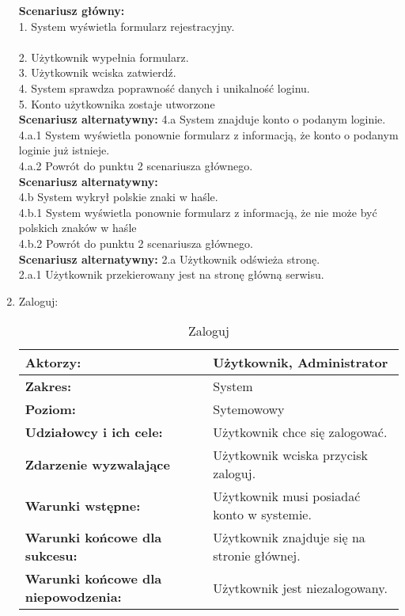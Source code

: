 \begin{enumerate}[label=(\Roman*)]
\textbf{Scenariusz główny:}\\
1. System wyświetla formularz rejestracyjny.\\\\
2. Użytkownik wypełnia formularz.\\
3. Użytkownik wciska zatwierdź.\\
4. System sprawdza poprawność danych i unikalność loginu.\\
5. Konto użytkownika zostaje utworzone\\
\textbf{Scenariusz alternatywny:}
4.a System znajduje konto o podanym loginie.\\
4.a.1 System wyświetla ponownie formularz z informacją, że konto o podanym loginie już
istnieje.\\
4.a.2 Powrót do punktu 2 scenariusza głównego.\\
\textbf{Scenariusz alternatywny:}\\
4.b System wykrył polskie znaki w haśle.\\
4.b.1 System wyświetla ponownie formularz z informacją, że nie może być polskich znaków
w haśle\\
4.b.2 Powrót do punktu 2 scenariusza głównego.\\
\textbf{Scenariusz alternatywny:}
2.a Użytkownik odświeża stronę.\\
2.a.1 Użytkownik przekierowany jest na stronę główną serwisu.\\

\item Zaloguj:
	\begin{table}[h]
\centering
\caption{Zaloguj}
\label{Zaloguj}
\begin{tabular}{|p{7cm}|p{7cm}|}
  \hline 
  \textbf{Aktorzy:} & Użytkownik, Administrator\\
  \hline
  \textbf{Zakres:} & System \\
	\hline
  \textbf{Poziom:} & Sytemowowy \\
	\hline
  \textbf{Udziałowcy i ich cele: } & Użytkownik chce się zalogować.
 \\
	\hline
  \textbf{Zdarzenie wyzwalające } & Użytkownik wciska przycisk zaloguj.\\
	\hline
  \textbf{Warunki wstępne: } & Użytkownik musi posiadać konto w systemie. \\
	\hline
  \textbf{Warunki końcowe dla sukcesu:} & Użytkownik znajduje się na stronie głównej.\\
	\hline
  \textbf{Warunki końcowe dla niepowodzenia:} & Użytkownik jest niezalogowany. \\
  \hline
\end{tabular} 
\end{table}


\end{enumerate}
